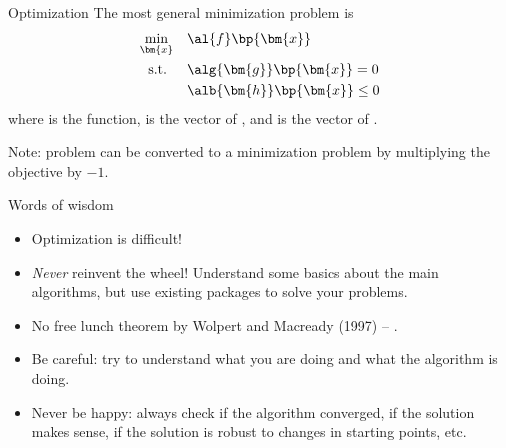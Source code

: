 \documentclass[11pt,xcolor={dvipsnames},aspectratio=159,hyperref={pdftex,pdfpagemode=UseNone,hidelinks,pdfdisplaydoctitle=true},usepdftitle=false]{beamer}
\begin{document}
\begin{frame}{Optimization}
The most general minimization problem is
   \begin{align*}
         \min_{\bm{x}} \quad & \al{f}\bp{\bm{x}} \\
        \text{s.t. } \quad & \alg{\bm{g}}\bp{\bm{x}} = 0 \\
        & \alb{\bm{h}}\bp{\bm{x}} \leq 0
   \end{align*}
where  is the  function,  is the vector of , and  is the vector of .
\vspace{1cm}

Note:  problem can be converted to a minimization problem by multiplying the objective by $-1$.

\end{frame}
\begin{frame}{Words of wisdom}

    \begin{itemize}
        \item Optimization is difficult!
        \item \emph{Never} reinvent the wheel! Understand some basics about the main algorithms, but use existing packages to solve your problems.
        \item No free lunch theorem by Wolpert and Macready (1997) -- .
        \item Be careful: try to understand what you are doing and what the algorithm is doing. 
        \item Never be happy: always check if the algorithm converged, if the solution makes sense, if the solution is robust to changes in starting points, etc.
    \end{itemize}

\end{frame}
\end{document}
